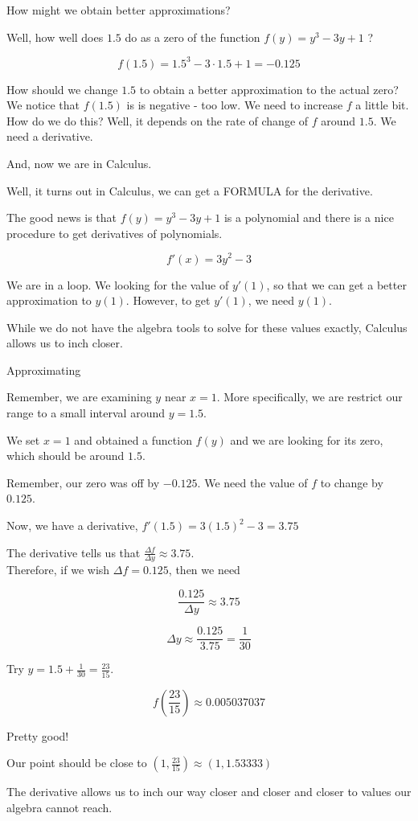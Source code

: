 \documentclass{ximera}
\begin{document}
How might we obtain better approximations?


Well, how well does $1.5$ do as a zero of the function $f(y) = y^3 - 3 y + 1$ ?


\[  f(1.5) = 1.5^3 - 3 \cdot 1.5 + 1 = -0.125 \]


How should we change $1.5$ to obtain a better approximation to the actual zero? \\


We notice that $f(1.5)$ is is negative - too low.  We need to increase $f$ a little bit.  How do we do this?  Well, it depends on the rate of change of $f$ around $1.5$.  We need a derivative.

And, now we are in Calculus.


Well, it turns out in Calculus, we can get a FORMULA for the derivative.



The good news is that $f(y) = y^3 - 3 y + 1$ is a polynomial and there is a nice procedure to get derivatives of polynomials.


\[
f'(x) = 3 y^2 - 3
\]


We are in a loop. We looking for the value of $y'(1)$, so that we can get a better approximation to $y(1)$. However, to get $y'(1)$, we need $y(1)$.

While we do not have the algebra tools to solve for these values exactly, Calculus allows us to inch closer.



\begin{example} Approximating


Remember, we are examining $y$ near $x = 1$.   More specifically, we are restrict our range to a small interval around $y = 1.5$.  

We set $x = 1$ and obtained a function $f(y)$ and we are looking for its zero, which should be around $1.5$.


Remember, our zero was off by $-0.125$.  We need the value of $f$ to change by $0.125$.


Now, we have a derivative, $f'(1.5) = 3 (1.5)^2 - 3 = 3.75$


The derivative tells us that $\frac{\Delta f}{\Delta y} \approx 3.75$. \\

Therefore, if we wish $\Delta f = 0.125$, then we need 



\[
\frac{0.125}{\Delta y} \approx 3.75
\]


\[
\Delta y \approx \frac{0.125}{3.75} = \frac{1}{30}
\]


Try $y = 1.5 + \frac{1}{30} = \frac{23}{15}$.


\[  f\left( \frac{23}{15} \right) \approx 0.005037037 \]


Pretty good!


Our point should be close to $\left(1, \frac{23}{15} \right) \approx (1, 1.53333)$


The derivative allows us to inch our way closer and closer and closer to values our algebra cannot reach.

\end{example}
\end{document}
